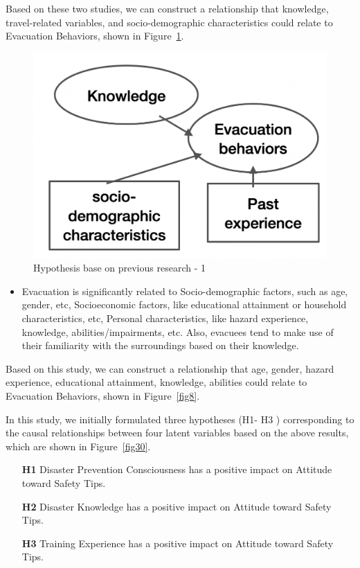 Based on these two studies, we can construct a relationship that knowledge, travel-related variables, and socio-demographic characteristics could relate to Evacuation Behaviors, shown in Figure~\ref{fig7}. 

\begin{figure}[h]
  \includegraphics[width=0.5\linewidth]{Figure/Figure7.png}
  \centering
  \caption{Hypothesis base on previous research - 1 }
  \label{fig7}
\end{figure}

\begin{itemize}
\item Evacuation is significantly related to Socio-demographic factors, such as age, gender, etc, Socioeconomic factors, like educational attainment or household characteristics, etc, Personal characteristics, like hazard experience, knowledge, abilities/impairments, etc. Also, evacuees tend to make use of their familiarity with the surroundings based on their knowledge.~\cite{Wang2021IncorporatingHF}
\end{itemize}

Based on this study, we can construct a relationship that age, gender, hazard experience,  educational attainment, knowledge, abilities could relate to Evacuation Behaviors, shown in Figure~\ref{fig8}. 

In this study, we initially formulated three hypotheses (H1- H3 ) corresponding to the causal relationships between four latent variables based on the above results, which are shown in Figure~\ref{fig30}.


\begin{itemize}
\item[\textbf{H1}] Disaster Prevention Consciousness has a positive impact on Attitude toward Safety Tips.

\item[\textbf{H2}] Disaster Knowledge has a positive impact on Attitude toward Safety Tips.
\item[\textbf{H3}] Training Experience has a positive impact on Attitude toward Safety Tips.
\end{itemize}

